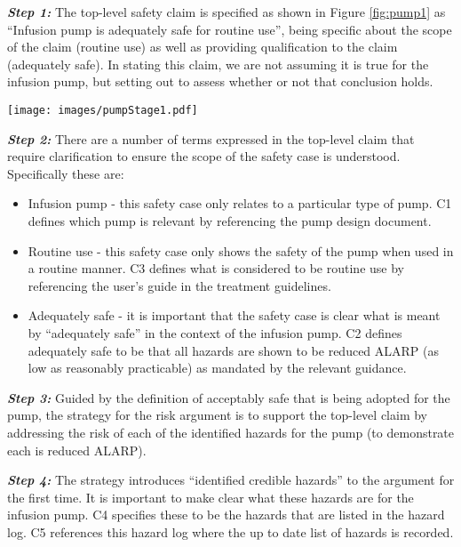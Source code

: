 \textbf{\textit{Step 1:}} The top-level safety claim is specified as shown in Figure \ref{fig:pump1} as ``Infusion pump is adequately safe for routine use'', being specific about the scope of the claim (routine use) as well as providing qualification to the claim (adequately safe). In stating this claim, we are not assuming it is true for the infusion pump, but setting out to assess whether or not that conclusion holds.

\begin{figure*}
\texttt{[image: images/pumpStage1.pdf]}
\caption{A single level of decomposition of the risk argument for the infusion pump safety case.}
\label{fig:pump1}
\end{figure*}

\textbf{\textit{Step 2:}} There are a number of terms expressed in the top-level claim that require clarification to ensure the scope of the safety case is understood. Specifically these are:

\begin{itemize}
    \item Infusion pump - this safety case only relates to a particular type of pump. C1 defines which pump is relevant by referencing the pump design document.
    \item Routine use - this safety case only shows the safety of the pump when used in a routine manner. C3 defines what is considered to be routine use by referencing the user's guide in the treatment guidelines.
    \item Adequately safe - it is important that the safety case is clear what is meant by ``adequately safe'' in the context of the infusion pump. C2 defines adequately safe to be that all hazards are shown to be reduced ALARP (as low as reasonably practicable) as mandated by the relevant guidance.
\end{itemize}

\textbf{\textit{Step 3:}} Guided by the definition of acceptably safe that is being adopted for the pump, the strategy for the risk argument is to support the top-level claim by addressing the risk of each of the identified hazards for the pump (to demonstrate each is reduced ALARP).

\textbf{\textit{Step 4:}} The strategy introduces ``identified credible hazards'' to the argument for the first time. It is important to make clear what these hazards are for the infusion pump. C4 specifies these to be the hazards that are listed in the hazard log. C5 references this hazard log where the up to date list of hazards is recorded. 

